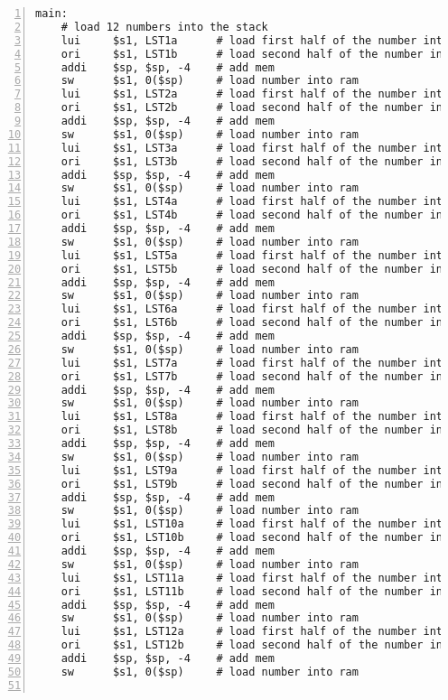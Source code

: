 \documentclass[11pt]{article}
\begin{document}
\begin{lstlisting}[numbers=left,basicstyle=\footnotesize]
main:
    # load 12 numbers into the stack
    lui     $s1, LST1a      # load first half of the number into reg
    ori     $s1, LST1b      # load second half of the number into reg
    addi    $sp, $sp, -4    # add mem
    sw      $s1, 0($sp)     # load number into ram
    lui     $s1, LST2a      # load first half of the number into reg
    ori     $s1, LST2b      # load second half of the number into reg
    addi    $sp, $sp, -4    # add mem
    sw      $s1, 0($sp)     # load number into ram
    lui     $s1, LST3a      # load first half of the number into reg
    ori     $s1, LST3b      # load second half of the number into reg
    addi    $sp, $sp, -4    # add mem
    sw      $s1, 0($sp)     # load number into ram
    lui     $s1, LST4a      # load first half of the number into reg
    ori     $s1, LST4b      # load second half of the number into reg
    addi    $sp, $sp, -4    # add mem
    sw      $s1, 0($sp)     # load number into ram
    lui     $s1, LST5a      # load first half of the number into reg
    ori     $s1, LST5b      # load second half of the number into reg
    addi    $sp, $sp, -4    # add mem
    sw      $s1, 0($sp)     # load number into ram
    lui     $s1, LST6a      # load first half of the number into reg
    ori     $s1, LST6b      # load second half of the number into reg
    addi    $sp, $sp, -4    # add mem
    sw      $s1, 0($sp)     # load number into ram
    lui     $s1, LST7a      # load first half of the number into reg
    ori     $s1, LST7b      # load second half of the number into reg
    addi    $sp, $sp, -4    # add mem
    sw      $s1, 0($sp)     # load number into ram
    lui     $s1, LST8a      # load first half of the number into reg
    ori     $s1, LST8b      # load second half of the number into reg
    addi    $sp, $sp, -4    # add mem
    sw      $s1, 0($sp)     # load number into ram
    lui     $s1, LST9a      # load first half of the number into reg
    ori     $s1, LST9b      # load second half of the number into reg
    addi    $sp, $sp, -4    # add mem
    sw      $s1, 0($sp)     # load number into ram
    lui     $s1, LST10a     # load first half of the number into reg
    ori     $s1, LST10b     # load second half of the number into reg
    addi    $sp, $sp, -4    # add mem
    sw      $s1, 0($sp)     # load number into ram
    lui     $s1, LST11a     # load first half of the number into reg
    ori     $s1, LST11b     # load second half of the number into reg
    addi    $sp, $sp, -4    # add mem
    sw      $s1, 0($sp)     # load number into ram
    lui     $s1, LST12a     # load first half of the number into reg
    ori     $s1, LST12b     # load second half of the number into reg
    addi    $sp, $sp, -4    # add mem
    sw      $s1, 0($sp)     # load number into ram
    

\end{lstlisting}
\end{document}
